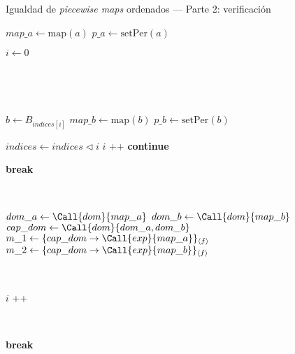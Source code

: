 \begin{algorithm}
\caption{Igualdad de \textit{piecewise maps} ordenados — Parte 2: verificación}
\label{alg:igualdad-ord2}
\begin{algorithmic}[1]
        \State  $map\_a \gets \mathrm{map}(a)$
        \State  $p\_a \gets \mathrm{setPer}(a)$
    \

        \State $i \gets 0$
                
    \
    
                
    \
    
            \State $b \gets B_{indices[i]}$
            \State  $map\_b \gets \mathrm{map}(b)$
            \State  $p\_b \gets \mathrm{setPer}(b)$
    \
    
                \State $indices \gets indices 	\triangleleft  i$
                 \State $i$ \!+\!+ 
                \State \textbf{continue}
            \EndIf

                \State \textbf{break}
            \EndIf

\
            
                \State $dom\_a \gets \Call{dom}{map\_a}$
                \State $dom\_b \gets \Call{dom}{map\_b}$
                 \State $cap\_dom \gets \Call{dom}{dom\_a, dom\_b}$
                        \State $m\_1 \gets \{cap\_dom \rightarrow \Call{exp}{map\_a}\}_{\langle f \rangle}$
                        \State $m\_2 \gets \{cap\_dom \rightarrow \Call{exp}{map\_b}\}_{\langle f \rangle}$
                            \State {}
                        \EndIf
                    \Else
                            \State {}
                        \EndIf
                    \EndIf
                \EndIf
            \EndIf
            
        
    \
    
            \State $i$ \!+\!+ 
        \EndWhile
        
    \
    
            \State \textbf{break}
        \EndIf
    \EndFor
            
    \
    
    \State {}
\EndFunction
\end{algorithmic}
\end{algorithm}


